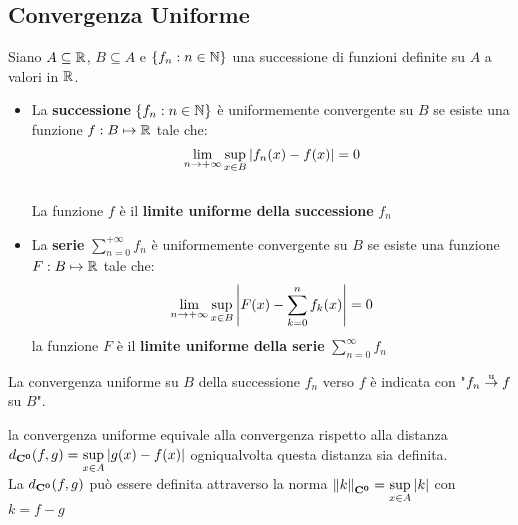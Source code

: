 \subsection{Convergenza Uniforme}
\begin{definition}
	\label{def:conv_unif}
	Siano $A\subseteq \mathbb{R}$, $B\subseteq A$ e $\left\{f_n:n\in\mathbb{N}\right\}$ una successione di funzioni definite su $A$ a valori in $\mathbb{R}$.
	\begin{itemize}
		\item La \textbf{successione} $\left\{f_n:n\in \mathbb{N}\right\}$ è uniformemente convergente su $B$ se esiste una funzione $f:B\mapsto \mathbb{R}$ tale che:
		$$\lim\limits_{n \to +\infty} \sup\limits_{x\in B}\left|f_n(x)-f(x)\right|=0$$\\
		La funzione $f$ è il \textbf{limite uniforme della successione} $f_n$
		\item La \textbf{serie} $\sum\limits_{n=0}^{+\infty}f_n$ è uniformemente convergente su $B$ se esiste una funzione $F:B\mapsto \mathbb{R}$ tale che:
		$$\lim\limits_{n\to +\infty} \sup\limits_{x\in B}\left|F(x)-\sum\limits_{k=0}^n f_k(x)\right|=0$$
		la funzione $F$ è il \textbf{limite uniforme della serie} $\sum\limits_{n=0}^{\infty}f_n$
	\end{itemize}
	La convergenza uniforme su $B$ della successione $f_n$ verso $f$ è indicata con "$f_n \overset{\text{u}}{\to} f$ su $B$".
\end{definition}
\begin{observation}
	\label{obs:dist_conv_unif}
	la convergenza uniforme equivale alla convergenza rispetto alla distanza $d_{\mathbf{C^{0}}}(f,g)=\sup\limits_{x\in A}\left|g(x)-f(x)\right|$ ogniqualvolta questa distanza sia definita.\\
	La $d_{\mathbf{C^{0}}}(f,g)$ può essere definita attraverso la norma $\left\|k\right\|_{\mathbf{C^{0}}}=\sup\limits_{x\in A}\left|k\right|$ con $k = f-g$
\end{observation}


